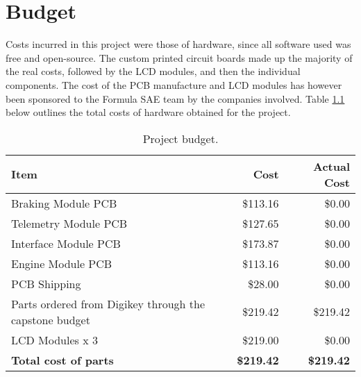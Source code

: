 \chapter{Budget}

Costs incurred in this project were those of hardware, since all software used was free and open-source. The custom printed circuit boards made up the majority of the real costs, followed by the LCD modules, and then the individual components. The cost of the PCB manufacture and LCD modules has however  been sponsored to the Formula SAE team by the companies involved. Table \ref{tab:budget} below outlines the total costs of hardware obtained for the project.

    \begin{table}[H]
      \begin{centering}
	\caption{Project budget.}\label{tab:budget}
	\begin{tabular}{|l|r|r|}
	  \hline 
	  \textbf{Item} & \textbf{Cost} & \textbf{Actual Cost} \tabularnewline
	  \hline
	  \hline 
	  Braking Module PCB & \$113.16 & \$0.00 \tabularnewline
	  \hline 
	  Telemetry Module PCB & \$127.65 & \$0.00\tabularnewline
	  \hline 
	  Interface Module PCB & \$173.87 & \$0.00\tabularnewline
	  \hline 
	  Engine Module PCB & \$113.16 & \$0.00\tabularnewline
	  \hline 
	  PCB Shipping & \$28.00 & \$0.00\tabularnewline
	  \hline
	  Parts ordered from Digikey through the capstone budget & \$219.42 & \$219.42 \tabularnewline
	  \hline
	  LCD Modules x 3 & \$219.00 & \$0.00 \tabularnewline
	  \hline
	  \hline 
	  \textbf{Total cost of parts} & \textbf{\$219.42} & \textbf{\$219.42} \tabularnewline
	  \hline
	\end{tabular}
	\par
      \end{centering}
    \end{table}